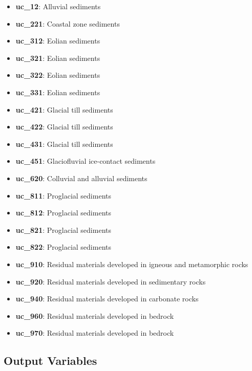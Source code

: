 \documentclass[
]{article}
\providecommand{\tightlist}{%
  \setlength{\itemsep}{0pt}\setlength{\parskip}{0pt}}
\begin{document}
\begin{itemize}
\tightlist
\item
  \textbf{uc\_12}: Alluvial sediments
\item
  \textbf{uc\_221}: Coastal zone sediments
\item
  \textbf{uc\_312}: Eolian sediments
\item
  \textbf{uc\_321}: Eolian sediments
\item
  \textbf{uc\_322}: Eolian sediments
\item
  \textbf{uc\_331}: Eolian sediments
\item
  \textbf{uc\_421}: Glacial till sediments
\item
  \textbf{uc\_422}: Glacial till sediments
\item
  \textbf{uc\_431}: Glacial till sediments
\item
  \textbf{uc\_451}: Glaciofluvial ice-contact sediments
\item
  \textbf{uc\_620}: Colluvial and alluvial sediments
\item
  \textbf{uc\_811}: Proglacial sediments
\item
  \textbf{uc\_812}: Proglacial sediments
\item
  \textbf{uc\_821}: Proglacial sediments
\item
  \textbf{uc\_822}: Proglacial sediments
\item
  \textbf{uc\_910}: Residual materials developed in igneous and
  metamorphic rocks
\item
  \textbf{uc\_920}: Residual materials developed in sedimentary rocks
\item
  \textbf{uc\_940}: Residual materials developed in carbonate rocks
\item
  \textbf{uc\_960}: Residual materials developed in bedrock
\item
  \textbf{uc\_970}: Residual materials developed in bedrock
\end{itemize}

\hypertarget{output-variables}{%
\subsection{Output Variables}\label{output-variables}}
\end{document}
